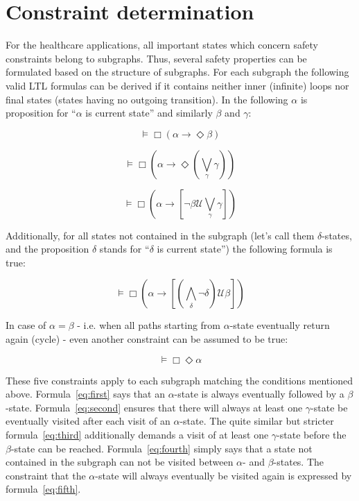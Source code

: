 \section{Constraint determination}
\label{sec:constraintdetermination}

For the healthcare applications, all important states which concern safety constraints belong to subgraphs. Thus, several safety properties can be formulated based on the structure of subgraphs.
For each subgraph the following valid LTL formulas can be derived if it contains neither inner (infinite) loops nor final states (states having no outgoing transition). In the following $\alpha$ is proposition for ``$\alpha$ is current state'' and similarly $\beta$ and $\gamma$:

\begin{equation} \label{eq:first}
  \models \Box (\alpha \rightarrow \Diamond \beta)
\end{equation}

\begin{equation} \label{eq:second}
  \models \Box (\alpha \rightarrow \Diamond (\bigvee_{\gamma} \gamma))
\end{equation}

\begin{equation} \label{eq:third}
  \models \Box (\alpha \rightarrow [\neg \beta \mathcal{U} \bigvee_{\gamma} \gamma])
\end{equation}

Additionally, for all states not contained in the subgraph (let's call them $\delta$-states, and the proposition $\delta$ stands for ``$\delta$ is current state'') the following formula is true: 

\begin{equation} \label{eq:fourth}
  \models \Box (\alpha \rightarrow [(\bigwedge_{\delta} \neg \delta) \mathcal{U} \beta])
\end{equation}

In case of $\alpha = \beta$ - i.e. when all paths starting from $\alpha$-state eventually return again (cycle) - even another constraint can be assumed to be true:

\begin{equation} \label{eq:fifth}
  \models \Box \Diamond \alpha
\end{equation}
 

These five constraints apply to each subgraph matching the conditions mentioned above. Formula~\ref{eq:first} says that an $\alpha$-state is always eventually followed by a $\beta$-state. Formula~\ref{eq:second} ensures that there will always at least one $\gamma$-state be eventually visited after each visit of an $\alpha$-state. The quite similar but stricter formula~\ref{eq:third} additionally demands a visit of at least one $\gamma$-state before the $\beta$-state can be reached. Formula~\ref{eq:fourth} simply says that a state not contained in the subgraph can not be visited between $\alpha$- and $\beta$-states. The constraint that the $\alpha$-state will always eventually be visited again is expressed by formula~\ref{eq:fifth}.

